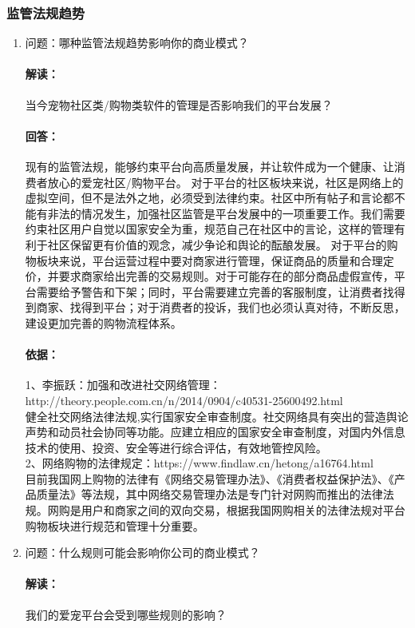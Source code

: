 \documentclass[a4paper]{ctexart}
\begin{document}
\subsubsection{监管法规趋势}
\begin{enumerate}[label=\alph*.]
  \item 问题：哪种监管法规趋势影响你的商业模式？
  \paragraph{解读：}当今宠物社区类/购物类软件的管理是否影响我们的平台发展？
  \paragraph{回答：}现有的监管法规，能够约束平台向高质量发展，并让软件成为一个健康、让消费者放心的爱宠社区/购物平台。
  对于平台的社区板块来说，社区是网络上的虚拟空间，但不是法外之地，必须受到法律约束。社区中所有帖子和言论都不能有非法的情况发生，加强社区监管是平台发展中的一项重要工作。我们需要约束社区用户自觉以国家安全为重，规范自己在社区中的言论，这样的管理有利于社区保留更有价值的观念，减少争论和舆论的酝酿发展。
  对于平台的购物板块来说，平台运营过程中要对商家进行管理，保证商品的质量和合理定价，并要求商家给出完善的交易规则。对于可能存在的部分商品虚假宣传，平台需要给予警告和下架；同时，平台需要建立完善的客服制度，让消费者找得到商家、找得到平台；对于消费者的投诉，我们也必须认真对待，不断反思，建设更加完善的购物流程体系。
  \paragraph{依据：}1、李振跃：加强和改进社交网络管理：\\http://theory.people.com.cn/n/2014/0904/c40531-25600492.html\\
  健全社交网络法律法规,实行国家安全审查制度。社交网络具有突出的营造舆论声势和动员社会协同等功能。应建立相应的国家安全审查制度，对国内外信息技术的使用、投资、安全等进行综合评估，有效地管控⻛险。\\2、网络购物的法律规定：https://www.findlaw.cn/hetong/a16764.html\\
  目前我国网上购物的法律有《网络交易管理办法》、《消费者权益保护法》、《产品质量法》等法规，其中网络交易管理办法是专门针对网购而推出的法律法规。网购是用户和商家之间的双向交易，根据我国网购相关的法律法规对平台购物板块进行规范和管理十分重要。
  \item 问题：什么规则可能会影响你公司的商业模式？
  \paragraph{解读：}我们的爱宠平台会受到哪些规则的影响？

\end{enumerate}
\end{document}
